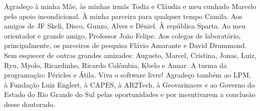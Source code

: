 \documentclass[
    oneside, %
	12pt,				%
	a4paper,			%
	chapter=TITLE,		%
	english,			%
	french,				%
	spanish,			%
	brazil				%
	]{abntex2}
\begin{document}
\frenchspacing 


\imprimircapa

\imprimirfolhaderosto*


%
%     


%
% 
%

\begin{agradecimentos}

Agradeço à minha Mãe, às minhas irmãs Todia e Cláudia e meu cunhado Marcelo pelo apoio incondicional. À minha parceira para qualquer tempo Camila. Aos amigos de JF Skeli, Disco, Gunzo, Alves e Dêniel. À república Sparta. Ao meu orientador e grande amigo, Professor João Felipe. Aos colegas de laboratório, principalmente, os parceiros de pesquisa Flávio Amarante e David Drummond. Sem esquecer de outras grandes amizades: Augusto, Marcel, Cristina, Jonas, Luiz, Ryu, Myolo, Ricardinho, Ricardo Colômbia, Kbelo e Anuar. A turma  da programação: Péricles e Átila. Viva o software livre! Agradeço também ao LPM, à Fundação Luiz Englert, à CAPES, à AR2Tech, à Geovarinaces e ao Governo do Estado do Rio Grande do Sul pelas oportunidades e por incentivarem a conclusão desse doutorado.

\end{agradecimentos}
\end{document}
